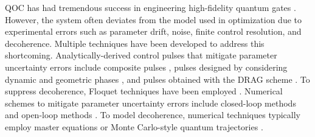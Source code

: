 QOC has had tremendous success in
engineering high-fidelity quantum gates \cite{
  chou2015optimal, dolde2014high, egger2013optimized, egger2014adaptive,
  grace2007optimal, heeres2017implementing, huang2014optimal,
  kelly2014optimal, leng2019robust, liebermann2016optimal,
  nebendahl2009optimal, rebentrost2009optimal, rebentrost2009optimal2,
  spiteri2018quantum, sporl2007optimal}. 
However, the system often
deviates from the model used in optimization
due to experimental errors such as parameter drift, noise, finite control 
resolution, and decoherence. Multiple techniques have been
developed to address this shortcoming.
Analytically-derived control pulses that
mitigate parameter uncertainty errors include
composite pulses \cite{cummins2000use, cummins2003tackling,
  kupce1995stretched, merrill2014progress},
pulses designed by considering dynamic and geometric phases
\cite{han2020experimental, xu2020nonadiabatic}, and
pulses obtained with the DRAG scheme \cite{motzoi2009simple}.
To suppress decoherence, Floquet techniques have been employed
\cite{huang2020engineering, mundada2020floquet}.
Numerical schemes to mitigate parameter uncertainty errors
include closed-loop methods \cite{egger2014adaptive, feng2018gradient,
  wittler2020integrated} and open-loop methods \cite{
  allen2019robust, carvalho2020error, reinhold2019controlling,
  rembold2020introduction, kosut2013robust}.
To model decoherence, numerical techniques typically employ
master equations \cite{rembold2020introduction, schulteherbruggen2011optimal} or
Monte Carlo-style quantum trajectories \cite{abdelhafez2019gradient}.


